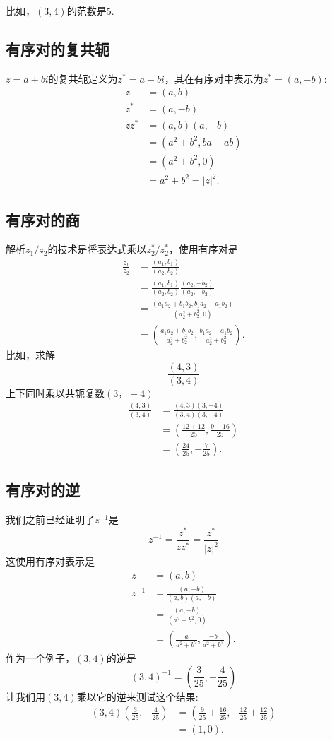 比如，$(3,4)$的范数是$5$.

\subsection{有序对的复共轭}
$z=a+b i$的复共轭定义为$z^{*}=a-b i$，其在有序对中表示为$z^{*}=(a,-b)$:
$$
\begin{aligned}
z & =(a, b) \\
z^{*} & =(a,-b) \\
z z^{*} & =(a, b)(a,-b) \\
& =\left(a^{2}+b^{2}, b a-a b\right) \\
& =\left(a^{2}+b^{2}, 0\right) \\
& =a^{2}+b^{2}=|z|^{2} .
\end{aligned}
$$

\subsection{有序对的商}
解析$z_{1} / z_{2}$的技术是将表达式乘以$z_{2}^{*} / z_{2}^{*}$，使用有序对是
$$
\begin{aligned}
\frac{z_{1}}{z_{2}} & =\frac{\left(a_{1}, b_{1}\right)}{\left(a_{2}, b_{2}\right)} \\
& =\frac{\left(a_{1}, b_{1}\right)}{\left(a_{2}, b_{2}\right)} \frac{\left(a_{2},-b_{2}\right)}{\left(a_{2},-b_{2}\right)} \\
& =\frac{\left(a_{1} a_{2}+b_{1} b_{2}, b_{1} a_{2}-a_{1} b_{2}\right)}{\left(a_{2}^{2}+b_{2}^{2}, 0\right)} \\
& =\left(\frac{a_{1} a_{2}+b_{1} b_{2}}{a_{2}^{2}+b_{2}^{2}}, \frac{b_{1} a_{2}-a_{1} b_{2}}{a_{2}^{2}+b_{2}^{2}}\right) .
\end{aligned}
$$
比如，求解
$$
\frac{(4,3)}{(3,4)}
$$
上下同时乘以共轭复数$(3，-4)$
$$
\begin{aligned}
\frac{(4,3)}{(3,4)} & =\frac{(4,3)(3,-4)}{(3,4)(3,-4)} \\
& =\left(\frac{12+12}{25}, \frac{9-16}{25}\right) \\
& =\left(\frac{24}{25},-\frac{7}{25}\right) .
\end{aligned}
$$

\subsection{有序对的逆}
我们之前已经证明了$z^{-1}$是
$$
z^{-1}=\frac{z^{*}}{z z^{*}}=\frac{z^{*}}{|z|^{2}}
$$
这使用有序对表示是
$$
\begin{aligned}
z & =(a, b) \\
z^{-1} & =\frac{(a,-b)}{(a, b)(a,-b)} \\
& =\frac{(a,-b)}{\left(a^{2}+b^{2}, 0\right)} \\
& =\left(\frac{a}{a^{2}+b^{2}}, \frac{-b}{a^{2}+b^{2}}\right) .
\end{aligned}
$$
作为一个例子，$(3,4)$的逆是
$$
(3,4)^{-1}=\left(\frac{3}{25},-\frac{4}{25}\right)
$$
让我们用$(3,4)$乘以它的逆来测试这个结果:
$$
\begin{aligned}
(3,4)\left(\frac{3}{25},-\frac{4}{25}\right) & =\left(\frac{9}{25}+\frac{16}{25},-\frac{12}{25}+\frac{12}{25}\right) \\
& =(1,0) .
\end{aligned}
$$

